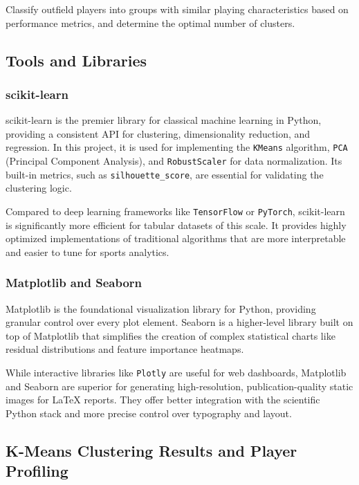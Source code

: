\documentclass[a4paper,12pt]{report}
\begin{document}
Classify outfield players into groups with similar playing characteristics based on performance metrics, and determine the optimal number of clusters.

\subsection{Tools and Libraries}

\subsubsection{scikit-learn}

scikit-learn is the premier library for classical machine learning in Python, providing a consistent API for clustering, dimensionality reduction, and regression. In this project, it is used for implementing the \texttt{KMeans} algorithm, \texttt{PCA} (Principal Component Analysis), and \texttt{RobustScaler} for data normalization. Its built-in metrics, such as \texttt{silhouette\_score}, are essential for validating the clustering logic.

Compared to deep learning frameworks like \texttt{TensorFlow} or \texttt{PyTorch}, scikit-learn is significantly more efficient for tabular datasets of this scale. It provides highly optimized implementations of traditional algorithms that are more interpretable and easier to tune for sports analytics.

\subsubsection{Matplotlib and Seaborn}

Matplotlib is the foundational visualization library for Python, providing granular control over every plot element. Seaborn is a higher-level library built on top of Matplotlib that simplifies the creation of complex statistical charts like residual distributions and feature importance heatmaps.

While interactive libraries like \texttt{Plotly} are useful for web dashboards, Matplotlib and Seaborn are superior for generating high-resolution, publication-quality static images for LaTeX reports. They offer better integration with the scientific Python stack and more precise control over typography and layout.

\subsection{K-Means Clustering Results and Player Profiling}
\end{document}
